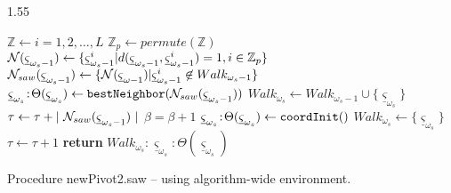 
\begin{algorithm-wide}[h]{1.55\textwidth}%
\begin{algorithmic}[1]
\STATE $\mathbb{Z} \gets i = 1,2, \ldots ,L $ 
\STATE $\mathbb{Z}_p \gets permute(\mathbb{Z}) $ 
\STATE ${\cal N} ({\underline \varsigma}_{\omega_{s} -1}) \gets  \{{\underline \varsigma}_{\omega_{s} -1}^i | d({\underline \varsigma}_{\omega_{s} -1}, {\underline \varsigma}_{\omega_{s} -1}^i ) = 1, i \in \mathbb{Z}_p\}$ 
\STATE ${\cal N}_{saw} ({\underline \varsigma}_{\omega_{s} -1}) \gets  \{ {\cal N} ({\underline \varsigma}_{\omega -1}) |
                      {\underline \varsigma}_{\omega_{s} -1}^i \not\in  Walk_{\omega_{s} -1}\}$
        \STATE ${\underline \varsigma}_{\omega_{s}}\!:\!\Theta({\underline \varsigma}_{\omega_{s}}) \gets {\tt bestNeighbor}({\cal N}_{saw} ({\underline \varsigma}_{\omega_{s} -1}))$
        \STATE $Walk_{\omega_{s}} \gets Walk_{\omega_{s}-1} \cup \{{\underline \varsigma}_{\omega_{s}}\}$
        \STATE $\tau \gets \tau + |~{\cal N}_{saw} ({\underline \varsigma}_{\omega_{s} -1})~| $ 
        \STATE $\beta = \beta + 1$ 
        \STATE ${\underline \varsigma}_{\omega_{s}}\!:\!\Theta({\underline \varsigma}_{\omega_{s}}) \gets {\tt coordInit}()$ 
        \STATE $Walk_{\omega_{s}} \gets \{ {\underline \varsigma}_{\omega_{s}} \}$
        \STATE $\tau \gets \tau + 1 $ 
    \ENDIF
\STATE \textbf{return} $Walk_{\omega_{s}}\!:\!{\underline \varsigma}_{\omega_{s}}\!:\!\Theta({\underline \varsigma}_{\omega_{s}})$ 
\ENDPROCEDURE 
\end{algorithmic}
\caption[Algorithm file: alg-newPivot2-wide.tex]{Procedure newPivot2.saw -- using algorithm-wide environment.}
\label{alg-newPivot2-wide}
\end{algorithm-wide}
